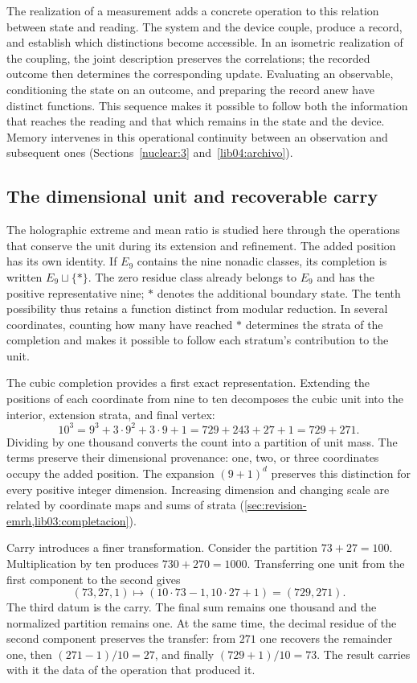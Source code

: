 The realization of a measurement adds a concrete operation to this relation
between state and reading. The system and the device couple, produce
a record, and establish which distinctions become accessible. In an
isometric realization of the coupling, the joint description preserves
the correlations; the recorded outcome then determines the
corresponding update. Evaluating an observable, conditioning the
state on an outcome, and preparing the record anew have distinct
functions. This sequence makes it possible to follow both the information that
reaches the reading and that which remains in the state and the device.
Memory intervenes in this operational continuity between an observation
and subsequent ones (Sections~\ref{nuclear:3} and~\ref{lib04:archivo}).

\subsection*{The dimensional unit and recoverable carry}
\label{libnar:unidad}

The holographic extreme and mean ratio is studied here through the
operations that conserve the unit during its extension and
refinement. The added position has its own identity. If
\(E_9\) contains the nine nonadic classes, its completion is written
\(E_9\sqcup\{\ast\}\). The zero residue class already belongs to
\(E_9\) and has the positive representative nine; \(\ast\) denotes
the additional boundary state. The tenth possibility thus retains a
function distinct from modular reduction. In several coordinates, counting
how many have reached \(\ast\) determines the strata of the completion
and makes it possible to follow each stratum's contribution to the unit.

The cubic completion provides a first exact
representation. Extending the positions of each coordinate from nine to ten
decomposes the cubic unit into the interior, extension strata, and
final vertex:
\[
 10^3=9^3+3\cdot9^2+3\cdot9+1
     =729+243+27+1=729+271.
\]
Dividing by one thousand converts the count into a partition of unit mass.
The terms preserve their dimensional provenance: one, two, or three
coordinates occupy the added position. The expansion
\((9+1)^d\) preserves this distinction for every positive
integer dimension. Increasing dimension and changing scale are
related by coordinate maps and sums of strata
(\cref{sec:revision-emrh,lib03:completacion}).

Carry introduces a finer transformation. Consider the
partition \(73+27=100\). Multiplication by ten produces
\(730+270=1000\). Transferring one unit from the first component to
the second gives
\[
 (73,27,1)\longmapsto(10\cdot73-1,10\cdot27+1)
                  =(729,271).
\]
The third datum is the carry. The final sum remains one thousand and the
normalized partition remains one. At the same time, the decimal residue
of the second component preserves the transfer: from \(271\) one
recovers the remainder one, then \((271-1)/10=27\), and finally
\((729+1)/10=73\). The result carries with it the data of the
operation that produced it.

